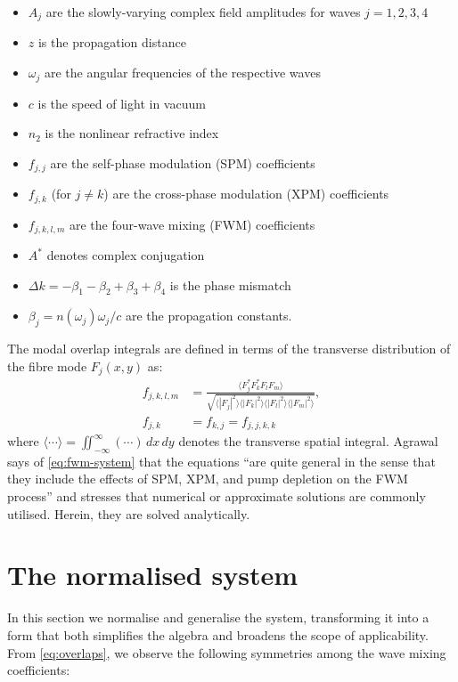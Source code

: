 \documentclass[11pt,a4paper]{article}
\numberwithin{equation}{section}
\begin{document}
\begin{itemize}
    \item $A_j$ are the slowly-varying complex field amplitudes for waves $j = 1, 2, 3, 4$
    \item $z$ is the propagation distance
    \item $\omega_j$ are the angular frequencies of the respective waves
    \item $c$ is the speed of light in vacuum
    \item $n_2$ is the nonlinear refractive index
    \item $f_{j,j}$ are the self-phase modulation (SPM) coefficients
    \item $f_{j,k}$ (for $j \neq k$) are the cross-phase modulation (XPM) coefficients
    \item $f_{j,k,l,m}$ are the four-wave mixing (FWM) coefficients
    \item $A^*$ denotes complex conjugation
    \item $\Delta k = -\beta_1 - \beta_2 + \beta_3 + \beta_4$ is the phase mismatch
    \item $\beta_j = n(\omega_j)\omega_j/c$ are the propagation constants.
\end{itemize}
The modal overlap integrals are defined in terms of the transverse distribution of the fibre mode $F_j(x,y)$ as:
\begin{align}
\label{eq:overlaps}
f_{j,k,l,m} &= \frac{\langle F_j^* F_k^* F_l F_m \rangle}{\sqrt{\langle |F_j|^2 \rangle \langle |F_k|^2 \rangle \langle |F_l|^2 \rangle \langle |F_m|^2 \rangle}}, \\
f_{j,k} &= f_{k,j} = f_{j,j,k,k}
\end{align}
where $\langle \cdots \rangle = \iint_{-\infty}^{\infty} (\cdots) \, dx\,dy$ denotes the transverse spatial integral. Agrawal says of \eqref{eq:fwm-system} that the equations ``are quite general in the sense that they include the effects of SPM, XPM, and pump depletion on the FWM process'' and stresses that numerical or approximate solutions are commonly utilised.
Herein, they are solved analytically.



\section{The normalised system}
In this section we normalise and generalise the system, transforming it into a form that both simplifies the algebra and broadens the scope of applicability.
From \eqref{eq:overlaps}, we observe the following symmetries among the wave mixing coefficients:
\end{document}
